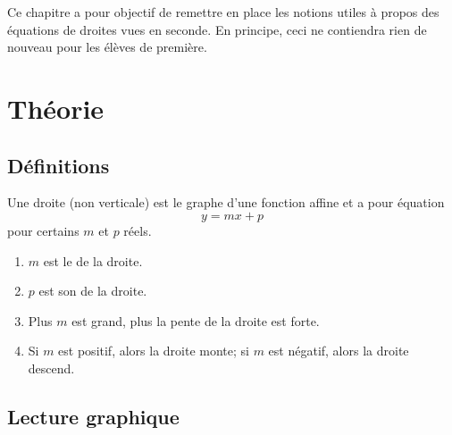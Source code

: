 

Ce chapitre a pour objectif de remettre en place les notions utiles à propos des équations de droites vues en seconde. En principe, ceci ne contiendra rien de nouveau pour les élèves de première.

\section{Théorie}

\subsection{Définitions}

Une droite (non verticale) est le graphe d'une fonction affine et a pour équation
\begin{equation}
    y=mx+p
\end{equation}
pour certains \( m\) et \( p \) réels.
\begin{enumerate}
    \item
        \( m\) est le  de la droite.
    \item
        \( p\) est son  de la droite.
    \item
        Plus \( m\) est grand, plus la pente de la droite est forte.
    \item
        Si \( m\) est positif, alors la droite monte; si \( m\) est négatif, alors la droite descend.
\end{enumerate}

\subsection{Lecture graphique}

